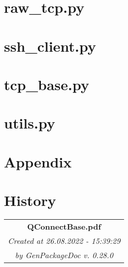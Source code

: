 \documentclass[a4paper,10pt]{report}
\begin{document}
\chapter{raw\_tcp.py}

      

\chapter{ssh\_client.py}

      

\chapter{tcp\_base.py}

      

\chapter{utils.py}

      

\chapter{Appendix}

      

\chapter{History}

      
\vfill
\begin{center}
\begin{tabular}{m{16em}}\hline
   \multicolumn{1}{c}{\textbf{QConnectBase.pdf}}\\
   \multicolumn{1}{c}{\textit{Created at 26.08.2022 - 15:39:29}}\\
   \multicolumn{1}{c}{\textit{by GenPackageDoc v. 0.28.0}}\\ \hline
\end{tabular}
\end{center}
\end{document}
